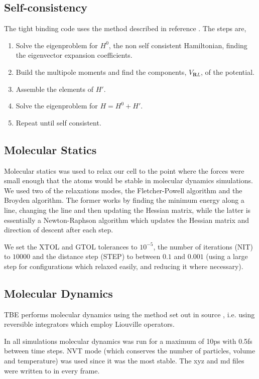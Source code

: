 \documentclass[reprint,]{revtex4-2}
\begin{document}
\subsection{Self-consistency}
\label{sec:self-consistent}
The tight binding code uses the method described in reference \cite{Paxton2009}. The steps are,
\begin{enumerate}
	\item Solve the eigenproblem for $H^{0}$, the non self consistent Hamiltonian, finding the eigenvector expansion coefficients.
	\item Build the multipole moments and find the components, $V_{\textbf{R}L}$, of the potential.
	\item Assemble the elements of $H'$.
	\item Solve the eigenproblem for $H=H^{0}+H'$.
	\item Repeat until self consistent.
\end{enumerate}

\subsection{Molecular Statics}
\label{sec:relax}
Molecular statics was used to relax our cell to the point where the forces were small enough that the atoms would be stable in molecular dynamics simulations. We used two of the relaxations modes, the Fletcher-Powell algorithm \cite{Fletcher1980,Davidson1959,CTRL} and the Broyden algorithm.\cite{Broyden1965} The former works by finding the minimum energy along a line, changing the line and then updating the Hessian matrix, while the latter is essentially a Newton-Raphson algorithm which updates the Hessian matrix and direction of descent after each step.

We set the XTOL and GTOL tolerances \cite{CTRL} to $10^{-5}$, the number of iterations (NIT) to $10000$ and the distance step (STEP) to between $0.1$ and $0.001$ (using a large step for configurations which relaxed easily, and reducing it where necessary).

\subsection{Molecular Dynamics}
\label{sec:MD}
TBE performs molecular dynamics using the method set out in source \cite{martyna1996explicit}, i.e. using reversible integrators which employ Liouville operators.

In all simulations molecular dynamics was run for a maximum of 10ps with 0.5fs between time steps. NVT mode (which conserves the number of particles, volume and temperature) was used since it was the most stable. The xyz and md files were written to in every frame.
\end{document}
